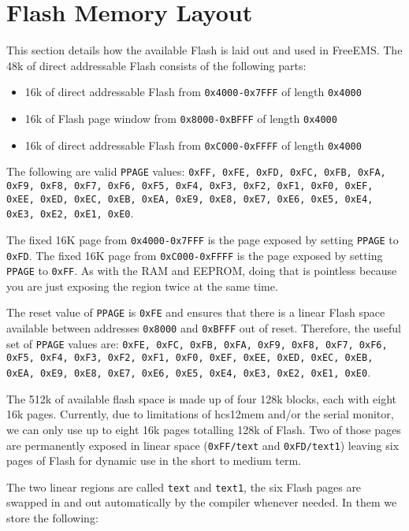 \documentclass[12pt,a4paper,titlepage]{article}
\begin{document}
\section{Flash Memory Layout}

This section details how the available Flash is laid out and used in FreeEMS.
The 48k of direct addressable Flash consists of the following parts:

\begin{itemize}
\item 16k of direct addressable Flash from \texttt{0x4000-0x7FFF} of length \texttt{0x4000}
\item 16k of Flash page window from \texttt{0x8000-0xBFFF} of length \texttt{0x4000}
\item 16k of direct addressable Flash from \texttt{0xC000-0xFFFF} of length \texttt{0x4000}
\end{itemize}

The following are valid \texttt{PPAGE} values: \texttt{0xFF, 0xFE, 0xFD, 0xFC,
0xFB, 0xFA, 0xF9, 0xF8, 0xF7, 0xF6, 0xF5, 0xF4, 0xF3, 0xF2, 0xF1, 0xF0, 0xEF,
0xEE, 0xED, 0xEC, 0xEB, 0xEA, 0xE9, 0xE8, 0xE7, 0xE6, 0xE5, 0xE4, 0xE3, 0xE2,
0xE1, 0xE0}.

The fixed 16K page from \texttt{0x4000-0x7FFF} is the page exposed by setting
\texttt{PPAGE} to \texttt{0xFD}. The fixed 16K page from \texttt{0xC000-0xFFFF}
is the page exposed by setting \texttt{PPAGE} to \texttt{0xFF}. As with the RAM
and EEPROM, doing that is pointless because you are just exposing the region
twice at the same time.

The reset value of \texttt{PPAGE} is \texttt{0xFE} and ensures that there
is a linear Flash space available between addresses \texttt{0x8000} and
\texttt{0xBFFF} out of reset. Therefore, the useful set of \texttt{PPAGE}
values are: \texttt{0xFE, 0xFC, 0xFB, 0xFA, 0xF9, 0xF8, 0xF7, 0xF6, 0xF5, 0xF4,
0xF3, 0xF2, 0xF1, 0xF0, 0xEF, 0xEE, 0xED, 0xEC, 0xEB, 0xEA, 0xE9, 0xE8, 0xE7,
0xE6, 0xE5, 0xE4, 0xE3, 0xE2, 0xE1, 0xE0}.

The 512k of available flash space is made up of four 128k blocks, each with
eight 16k pages. Currently, due to limitations of hcs12mem and/or the serial
monitor, we can only use up to eight 16k pages totalling 128k of Flash. Two of
those pages are permanently exposed in linear space (\texttt{0xFF/text} and
\texttt{0xFD/text1}) leaving six pages of Flash for dynamic use in the short to
medium term.

The two linear regions are called \texttt{text} and \texttt{text1}, the six Flash pages are
swapped in and out automatically by the compiler whenever needed. In them we
store the following:
\end{document}
